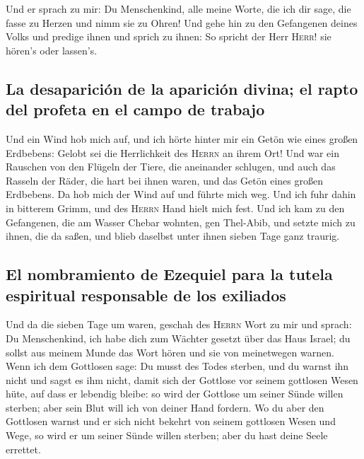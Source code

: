  Und er sprach zu mir: Du Menschenkind, alle meine Worte,
die ich dir sage, die fasse zu Herzen und nimm sie zu Ohren!
 Und gehe hin zu den Gefangenen deines Volks und predige
ihnen und sprich zu ihnen: So spricht der Herr \textsc{Herr}! sie
hören's oder lassen's.

\hypertarget{la-desapariciuxf3n-de-la-apariciuxf3n-divina-el-rapto-del-profeta-en-el-campo-de-trabajo}{%
\subsection{La desaparición de la aparición divina; el rapto del profeta
en el campo de
trabajo}\label{la-desapariciuxf3n-de-la-apariciuxf3n-divina-el-rapto-del-profeta-en-el-campo-de-trabajo}}

 Und ein Wind hob mich auf, und ich hörte hinter mir ein
Getön wie eines großen Erdbebens: Gelobt sei die Herrlichkeit des
\textsc{Herrn} an ihrem Ort!  Und war ein Rauschen von
den Flügeln der Tiere, die aneinander schlugen, und auch das Rasseln der
Räder, die hart bei ihnen waren, und das Getön eines großen Erdbebens.
 Da hob mich der Wind auf und führte mich weg. Und ich
fuhr dahin in bitterem Grimm, und des \textsc{Herrn} Hand hielt mich
fest.  Und ich kam zu den Gefangenen, die am Wasser
Chebar wohnten, gen Thel-Abib, und setzte mich zu ihnen, die da saßen,
und blieb daselbst unter ihnen sieben Tage ganz traurig.

\hypertarget{el-nombramiento-de-ezequiel-para-la-tutela-espiritual-responsable-de-los-exiliados}{%
\subsection{El nombramiento de Ezequiel para la tutela espiritual
responsable de los
exiliados}\label{el-nombramiento-de-ezequiel-para-la-tutela-espiritual-responsable-de-los-exiliados}}

 Und da die sieben Tage um waren, geschah des
\textsc{Herrn} Wort zu mir und sprach:  Du Menschenkind,
ich habe dich zum Wächter gesetzt über das Haus Israel; du sollst aus
meinem Munde das Wort hören und sie von meinetwegen warnen.
 Wenn ich dem Gottlosen sage: Du musst des Todes sterben,
und du warnst ihn nicht und sagst es ihm nicht, damit sich der Gottlose
vor seinem gottlosen Wesen hüte, auf dass er lebendig bleibe: so wird
der Gottlose um seiner Sünde willen sterben; aber sein Blut will ich von
deiner Hand fordern.  Wo du aber den Gottlosen warnst und
er sich nicht bekehrt von seinem gottlosen Wesen und Wege, so wird er um
seiner Sünde willen sterben; aber du hast deine Seele errettet.

